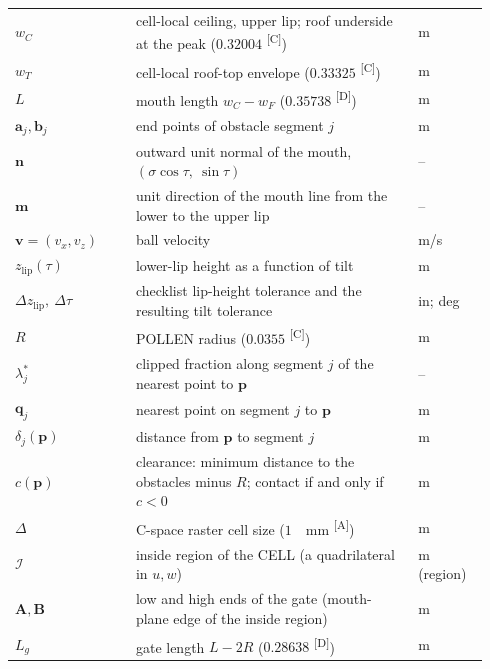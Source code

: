 \documentclass[11pt]{article}
\makeatletter
\DeclareRobustCommand{\provtag}[1]{%
  \ifmmode\text{\provtag@text{#1}}\else\provtag@text{#1}\fi}
\newcommand{\provtag@text}[1]{%
  \textsuperscript{\textsf{\upshape\scriptsize\color@grey[#1]}}}
\newcommand{\color@grey}[1]{#1}
\newcommand{\color@grey}[1]{\pdfliteral{0.45 g}#1\pdfliteral{0 g}}
\DeclareRobustCommand{\confirmed}{\provtag{C}}
\DeclareRobustCommand{\assumed}{\provtag{A}}
\DeclareRobustCommand{\derived}{\provtag{D}}
\newcommand{\vect}[1]{\bm{#1}}
\DeclareRobustCommand{\unit}[1]{%
  \ifmmode\text{\upshape #1}%
  \else
    \ifnum\lastnodetype=10 \,\fi
    \textup{#1}%
  \fi}
\makeatother
\begin{document}
\begin{table}[p]
\begin{tabular}{@{}p{0.24\linewidth}p{0.56\linewidth}p{0.14\linewidth}@{}}
  $w_C$ & cell-local ceiling, upper lip; roof underside at the peak ($0.32004$\confirmed) & m \\
  $w_T$ & cell-local roof-top envelope ($0.33325$\confirmed) & m \\
  $L$ & mouth length $w_C-w_F$ ($0.35738$\derived) & m \\
  $\vect{a}_j,\vect{b}_j$ & end points of obstacle segment $j$ & m \\
  $\vect{n}$ & outward unit normal of the mouth, $(\sigma\cos\tau,\ \sin\tau)$ & -- \\
  $\vect{m}$ & unit direction of the mouth line from the lower to the upper lip & -- \\
  $\vect{v}=(v_x,v_z)$ & ball velocity & m/s \\
  $z_{\mathrm{lip}}(\tau)$ & lower-lip height as a function of tilt & m \\
  $\Delta z_{\mathrm{lip}},\ \Delta\tau$ & checklist lip-height tolerance and the resulting tilt tolerance & in; deg \\
  $R$ & POLLEN radius ($0.0355$\confirmed) & m \\
  $\lambda_j^\ast$ & clipped fraction along segment $j$ of the nearest point to $\vect{p}$ & -- \\
  $\vect{q}_j$ & nearest point on segment $j$ to $\vect{p}$ & m \\
  $\delta_j(\vect{p})$ & distance from $\vect{p}$ to segment $j$ & m \\
  $c(\vect{p})$ & clearance: minimum distance to the obstacles minus $R$; contact if and only if $c<0$ & m \\
  $\Delta$ & C-space raster cell size ($1$\,\unit{mm}\assumed) & m \\
  $\mathcal{I}$ & inside region of the CELL (a quadrilateral in $u,w$) & m (region) \\
  $\vect{A},\vect{B}$ & low and high ends of the gate (mouth-plane edge of the inside region) & m \\
  $L_g$ & gate length $L-2R$ ($0.28638$\derived) & m \\
  \bottomrule
\end{tabular}
\end{table}
\end{document}
